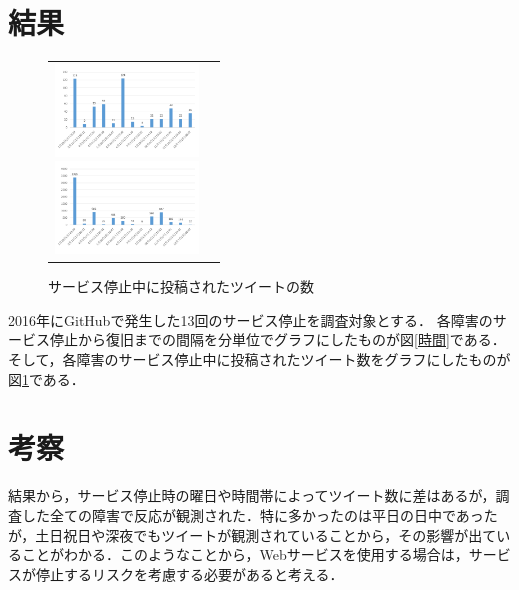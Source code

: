 \documentclass[uplatex,twocolumn,dvipdfmx]{jsarticle}
\begin{document}
\section{結果}
\vspace{-1.5zh}
\begin{figure}[htbp]
 \begin{tabular}{cc}
  \begin{minipage}{0.5\hsize}
    \begin{center}
      \includegraphics[width=38mm,clip]{graph1.pdf}
      \caption{サービス停止から復旧までの間隔}
      \label{時間}
  \end{center}
  \end{minipage}
  \begin{minipage}{0.5\hsize}
    \begin{center}
      \includegraphics[width=38mm,clip]{graph2.pdf}
      \caption{サービス停止中に投稿されたツイートの数}
      \label{ツイート数}
   \end{center} 
  \end{minipage}
 \end{tabular}
\end{figure}
\vspace{-1.5zh}
2016年にGitHubで発生した13回のサービス停止を調査対象とする．
各障害のサービス停止から復旧までの間隔を分単位でグラフにしたものが図\ref{時間}である．そして，各障害のサービス停止中に投稿されたツイート数をグラフにしたものが図\ref{ツイート数}である．


\section{考察}
結果から，サービス停止時の曜日や時間帯によってツイート数に差はあるが，調査した全ての障害で反応が観測された．特に多かったのは平日の日中であったが，土日祝日や深夜でもツイートが観測されていることから，その影響が出ていることがわかる．このようなことから，Webサービスを使用する場合は，サービスが停止するリスクを考慮する必要があると考える．
\end{document}
